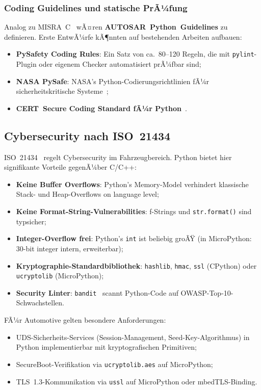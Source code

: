 ﻿\documentclass[12pt,a4paper,twoside]{article}
\begin{document}
\subsubsection{Coding Guidelines und statische PrÃ¼fung}
Analog zu MISRA~C~\cite{misra_c2012} wÃ¤ren \textbf{AUTOSAR~Python~Guidelines} zu definieren.
Erste EntwÃ¼rfe kÃ¶nnten auf bestehenden Arbeiten aufbauen:
\begin{itemize}
  \item \textbf{PySafety Coding Rules}: Ein Satz von ca.\ 80--120 Regeln,
        die mit \texttt{pylint}-Plugin oder eigenem Checker automatisiert
        prÃ¼fbar sind;
  \item \textbf{NASA PySafe}: NASA's Python-Codierungsrichtlinien
        fÃ¼r sicherheitskritische Systeme~\cite{nasa_python2011};
  \item \textbf{CERT~Secure Coding Standard fÃ¼r Python}~\cite{cert_python2019}.
\end{itemize}

\subsection{Cybersecurity nach ISO~21434}
\label{subsec:cybersecurity}

ISO~21434~\cite{iso21434_2021} regelt Cybersecurity im Fahrzeugbereich.
Python bietet hier signifikante Vorteile gegenÃ¼ber C/C++:

\begin{itemize}
  \item \textbf{Keine Buffer Overflows}: Python's Memory-Model verhindert
        klassische Stack- und Heap-Overflows on language level;
  \item \textbf{Keine Format-String-Vulnerabilities}: f-Strings und
        \texttt{str.format()} sind typsicher;
  \item \textbf{Integer-Overflow frei}: Python's \texttt{int} ist beliebig groÃŸ
        (in MicroPython: 30-bit integer intern, erweiterbar);
  \item \textbf{Kryptographie-Standardbibliothek}: \texttt{hashlib}, \texttt{hmac},
        \texttt{ssl} (CPython) oder \texttt{ucry\newline ptolib} (MicroPython);
  \item \textbf{Security Linter}: \texttt{bandit}~\cite{bandit2023} scannt
        Python-Code auf OWASP-Top-10-Schwachstellen.
\end{itemize}

FÃ¼r Automotive gelten besondere Anforderungen:
\begin{itemize}
  \item UDS-Sicherheits-Services (Session-Management, Seed-Key-Algorithmus)
        in Python implementierbar mit kryptografischen Primitiven;
  \item SecureBoot-Verifikation via \texttt{ucryptolib.aes} auf MicroPython;
  \item TLS~1.3-Kommunikation via \texttt{ussl} auf MicroPython oder
        mbedTLS-Binding.
\end{itemize}
\end{document}
